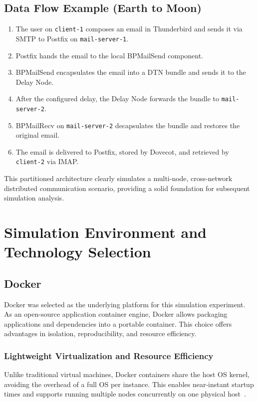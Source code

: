 \subsection*{Data Flow Example (Earth to Moon)}
\begin{enumerate}
    \item The user on \texttt{client-1} composes an email in Thunderbird and sends it via SMTP to Postfix on \texttt{mail-server-1}.
    \item Postfix hands the email to the local BPMailSend component.
    \item BPMailSend encapsulates the email into a DTN bundle and sends it to the Delay Node.
    \item After the configured delay, the Delay Node forwards the bundle to \texttt{mail-server-2}.
    \item BPMailRecv on \texttt{mail-server-2} decapsulates the bundle and restores the original email.
    \item The email is delivered to Postfix, stored by Dovecot, and retrieved by \texttt{client-2} via IMAP.
\end{enumerate}

This partitioned architecture clearly simulates a multi-node, cross-network distributed communication scenario, providing a solid foundation for subsequent simulation analysis.

\section{Simulation Environment and Technology Selection}

\subsection{Docker}
Docker was selected as the underlying platform for this simulation experiment. As an open-source application container engine, Docker allows packaging applications and dependencies into a portable container. This choice offers advantages in isolation, reproducibility, and resource efficiency.

\subsubsection*{Lightweight Virtualization and Resource Efficiency}
Unlike traditional virtual machines, Docker containers share the host OS kernel, avoiding the overhead of a full OS per instance. This enables near-instant startup times and supports running multiple nodes concurrently on one physical host~\cite{Docker}.


